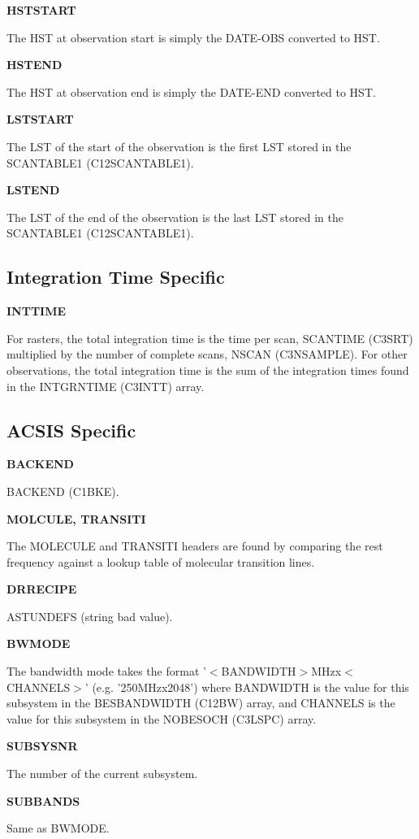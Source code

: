 \documentclass[twoside,11pt]{article}
\newcommand{\xlabel}[1]{}
\renewcommand{\_}{\texttt{\symbol{95}}}
\newcommand{\backend}{BACKEND (C1BKE)}
\newcommand{\nScan}{NSCAN (C3NSAMPLE)}
\newcommand{\scanTime}{SCAN\_TIME (C3SRT)}
\newcommand{\scanTableA}{SCAN\_TABLE1 (C12SCAN\_TABLE\_1)}
\newcommand{\BEChans}{NO\_BES\_O\_CH (C3LSPC)}
\newcommand{\bandwidths}{BES\_BANDWIDTH (C12BW)}
\newcommand{\intTimes}{INTGRN\_TIME (C3INTT)}
\newcommand{\backend}{BACKEND (C1BKE)\ref{GSDVars:backend}}
\newcommand{\nScan}{NSCAN (C3NSAMPLE)\ref{GSDVars:nScan}}
\newcommand{\scanTime}{SCAN\_TIME (C3SRT)\ref{GSDVars:scanTime}}
\newcommand{\scanTableA}{SCAN\_TABLE1 (C12SCAN\_TABLE\_1)\ref{GSDVars:scanTableA}}
\newcommand{\BEChans}{NO\_BES\_O\_CH (C3LSPC)\ref{GSDVars:BEChans}}
\newcommand{\bandwidths}{BES\_BANDWIDTH (C12BW)\ref{GSDVars:bandwidths}}
\newcommand{\intTimes}{INTGRN\_TIME (C3INTT)\ref{GSDVars:intTimes}}
\begin{document}
{\bf HSTSTART}

The HST at observation start is simply the DATE-OBS converted to HST.

{\bf HSTEND}

The HST at observation end is simply the DATE-END converted to HST.

{\bf LSTSTART}

The LST of the start of the observation is the first LST stored in the \scanTableA.

{\bf LSTEND}

The LST of the end of the observation is the last LST stored in the \scanTableA.

\subsection{\xlabel{FITS_Integration_Time}Integration Time Specific}

{\bf INT\_TIME}

For rasters, the total integration time is the time per scan, \scanTime{} multiplied by the number of complete scans, \nScan.  For other observations, the total integration time is the sum of the integration times found in the \intTimes{} array.

\subsection{\xlabel{FITS_ACSIS}ACSIS Specific}

{\bf BACKEND}

\backend.

{\bf MOLCULE, TRANSITI}

The MOLECULE and TRANSITI headers are found by comparing the rest frequency against a lookup table of molecular transition lines.

{\bf DRRECIPE}

AST\_\_UNDEFS (string bad value).

{\bf BWMODE}

The bandwidth mode takes the format '$<$BANDWIDTH$>$MHzx$<$CHANNELS$>$' (e.g. '250MHzx2048') where BANDWIDTH is the value for this subsystem in the \bandwidths{} array, and CHANNELS is the value for this subsystem in the \BEChans{} array.

{\bf SUBSYSNR}

The number of the current subsystem.

{\bf SUBBANDS}

Same as BWMODE.
\end{document}
